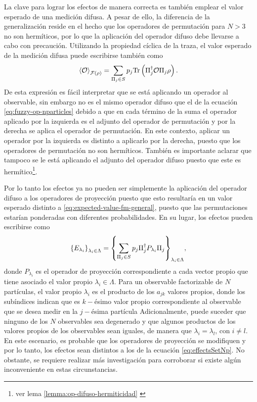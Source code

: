 La clave para lograr los efectos de manera correcta es también emplear el valor
esperado de una medición difusa. A pesar de ello, la diferencia de la
generalización reside en el hecho que los operadores de permutación para $N>3$
no son hermíticos, por lo que la aplicación del operador difuso debe llevarse a
cabo con precaución. Utilizando la propiedad cíclica de la traza, el valor
esperado de la medición difusa puede escribirse también como
\begin{equation}\label{eq:ExpectedValue-generalForm-2}\begin{split}
    \left \langle \mathcal{O}\right \rangle_{\mathcal{F}(\rho)} &=\sum_{\Pi_j \in S}p_j{\rm Tr} \left(\Pi_j^\dagger{\mathcal{O}}\Pi_j\rho\right).\\
\end{split}
\end{equation} 
De esta expresión es fácil interpretar  que se
está aplicando un operador al observable,
sin embargo no es el mismo operador difuso que el de la ecuación
{\eqref{eq:fuzzy-op-nparticles}} debido a que en cada término de la suma el
operador aplicado por la izquierda es el adjunto del operador de permutación y
por la derecha se aplica el operador de permutación. En este contexto, aplicar un operador por la
izquierda es distinto a aplicarlo por la derecha, puesto que los
operadores de permutación no son hermíticos. También
es importante aclarar
que tampoco se le está aplicando el adjunto del operador difuso puesto que este
es hermítico\footnote[3]{ver lema {\ref{lemma:op-difuso-hermiticidad} }}. 


Por lo tanto los efectos ya no pueden ser simplemente la aplicación del
operador difuso a los operadores de proyección puesto que esto resultaría en un
valor esperado distinto a {\eqref{eq:expected-value-fm-general}}, puesto que
las permutaciones estarían ponderadas con diferentes probabilidades. En su
lugar, los efectos pueden escribirse como
\begin{equation}\label{eq:effectsSetNp}
    {\{E_{\lambda_i}\}}_{\lambda_i \in \Lambda}={\left\{\sum_{\Pi_j \in S} p_j \Pi_{j}^{\dagger}P_{\lambda_i}\Pi_{j}\right\}}_{\lambda_i \in \Lambda},
\end{equation}  
donde $P_{\lambda_i}$ es el operador de proyección correspondiente a cada
vector propio que tiene asociado el valor propio $\lambda_i\in \Lambda$.  Para un observable factorizable de $N$ partículas,  el valor propio
$\lambda_i$ es el producto de los $a_{jk}$ valores propios, donde los
subíndices indican que es $k-$ésimo valor propio correspondiente al observable
que se desea medir en la $j-$ésima partícula
Adicionalmente, puede suceder que ninguno de los $N$ observables sea degenerado y que algunos productos de los valores propios de los observables sean iguales, de manera que $\lambda_i=\lambda_l$, con $i\ne l$. En este escenario, es probable que los operadores de proyección se modifiquen y por lo tanto, los efectos sean distintos a los de la ecuación {\eqref{eq:effectsSetNp}}. No obstante, se requiere realizar más investigación para corroborar si existe algún inconveniente en estas circunstancias.

